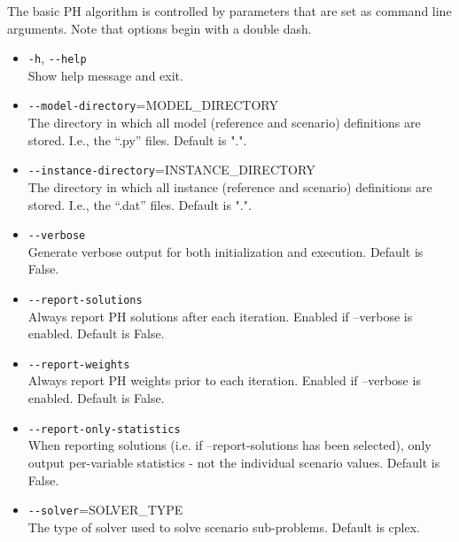 The basic PH algorithm is controlled by parameters that are set as command line
arguments. Note that options begin with a double dash.
\begin{itemize}
  \item \verb|-h|, \verb|--help|                                             \\
  Show help message and exit.

  \item \verb|--model-directory|=MODEL\_DIRECTORY                            \\
  The directory in which all model (reference and scenario) definitions are
  stored. I.e., the ``.py'' files. Default is ".".

  \item \verb|--instance-directory|=INSTANCE\_DIRECTORY                      \\
  The directory in which all instance (reference and scenario) definitions are
  stored. I.e., the ``.dat'' files. Default is ".".

  \item \verb|--verbose|                                                     \\
  Generate verbose output for both initialization and execution. Default is
  False.

  \item \verb|--report-solutions|                                            \\
  Always report PH solutions after each iteration. Enabled if --verbose is
  enabled. Default is False.

  \item \verb|--report-weights|                                              \\
  Always report PH weights prior to each iteration. Enabled if --verbose is
  enabled. Default is False.
  
  \item \verb|--report-only-statistics|                                      \\
     When reporting solutions (i.e. if --report-solutions has been selected), only output per-variable statistics - not the individual scenario values. Default is False.

  \item \verb|--solver|=SOLVER\_TYPE                                         \\
  The type of solver used to solve scenario sub-problems. Default is cplex.


\end{itemize}
